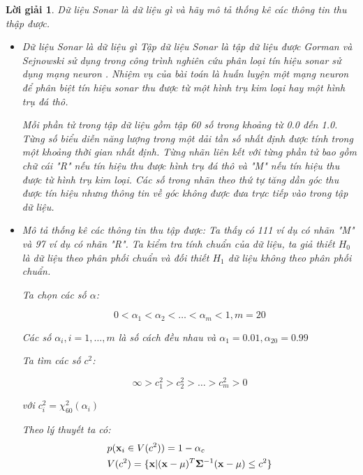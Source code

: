 \documentclass[14pt, a4paper]{article}
\theoremstyle{sltheorem}
\theoremstyle{soltheorem}
\newtheorem*{loigiai}{Lời giải}
\begin{document}
\begin{loigiai}
    Dữ liệu Sonar là dữ liệu gì và hãy mô tả thống kê các thông tin thu thập được.
    \begin{itemize}
        \item Dữ liệu Sonar là dữ liệu gì
        Tập dữ liệu Sonar là tập dữ liệu được Gorman và Sejnowski sử dụng trong công trình nghiên cứu phân loại tín hiệu sonar sử dụng mạng neuron \cite{gorman1988analysis}.
        Nhiệm vụ của bài toán là huấn luyện một mạng neuron để phân biệt tín hiệu sonar thu được từ một hình trụ kim loại hay một hình trụ đá thô.
        
        Mỗi phần tử trong tập dữ liệu gồm tập 60 số trong khoảng từ 0.0 đến 1.0.
        Từng số biểu diễn năng lượng trong một dải tần số nhất định được tính trong một khoảng thời gian nhất định. 
        Từng nhãn liên kết với từng phần tử bao gồm chữ cái "R" nếu tín hiệu thu được hình trụ đá thô và "M" nếu tín hiệu thu được từ hình trụ kim loại.
        Các số trong nhãn theo thứ tự tăng dần góc thu được tín hiệu nhưng thông tin về góc không được đưa trực tiếp vào trong tập dữ liệu.
        \item Mô tả thống kê các thông tin thu tập được:
        Ta thấy có 111 ví dụ có nhãn "M" và 97 ví dụ có nhãn "R".
        Ta kiểm tra tính chuẩn của dữ liệu, ta giả thiết $H_0$ là dữ liệu theo phân phối chuẩn và đối thiết $H_1$ dữ liệu không theo phân phối chuẩn.

        Ta chọn các số $\alpha$:

        \begin{equation*}
            0 < \alpha_1 < \alpha_2 < \dots < \alpha_m < 1, m = 20
        \end{equation*}

        Các số $\alpha_i, i = 1,\dots,m$ là số cách đều nhau và $\alpha_1=0.01, \alpha_{20}=0.99$

        Ta tìm các số $c^2$:

        \begin{equation*}
            \infty > c_1^2 > c_2^2 > \dots > c_m^2 > 0
        \end{equation*}

        với $c_i^2 = \chi_{60}^2 (\alpha_i)$

        Theo lý thuyết ta có:
        \begin{equation*}
            \begin{aligned}
                &p(\bold{x}_i \in V(c^2)) = 1 - \alpha_c \\
                &V(c^2) = \lbrace \bold{x} \vert (\bold{x} - \bold{\mu})^T \bold{\Sigma}^{-1} (\bold{x} - \bold{\mu}) \leq c^2 \rbrace
            \end{aligned}
        \end{equation*}


\end{itemize}
\end{loigiai}
\end{document}
